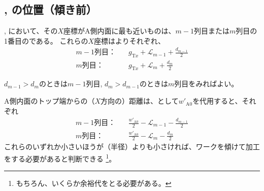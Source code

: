 \clearpage
\subsection{\BfaceDimple, \DfaceDimple の位置（傾き前）}
\BfaceDimple, \DfaceDimple において、その$X$座標がA側内面に最も近いものは、$m-1$列目または$m$列目の1番目の\nameDimple である。
これらの$X$座標はよりそれぞれ、
\begin{align*}
  m-1\text{列目：}&\quad
  g_{\mathrm Tx}+\mathcal L_{m-1}+\frac{d_{m-1}}2\\
  m\text{列目：}&\quad
  g_{\mathrm Tx}+\mathcal L_m+\frac{d_m}2
\end{align*}
\begin{hosoku}
$d_{m-1} > d_m$のときは$m-1$列目, $d_m > d_{m-1}$のときは$m$列目をみればよい。
\end{hosoku}
A側内面のトップ端からの（$X$方向の）距離は、\TopEndACID として$w'_{\mathrm A0}$を代用すると、それぞれ
\begin{align*}
  m-1\text{列目：}&\quad
  \frac{w'_{\mathrm A0}}2-\mathcal L_{m-1}-\frac{d_{m-1}}2\\
  m\text{列目：}&\quad
  \frac{w'_{\mathrm A0}}2-\mathcal L_m-\frac{d_m}2
\end{align*}
これらのいずれか小さいほうが\ToolDiameter（半径）よりも小さければ、ワークを傾けて加工をする必要があると判断できる
\footnote{もちろん、いくらか余裕代をとる必要がある。}。
\vfill
